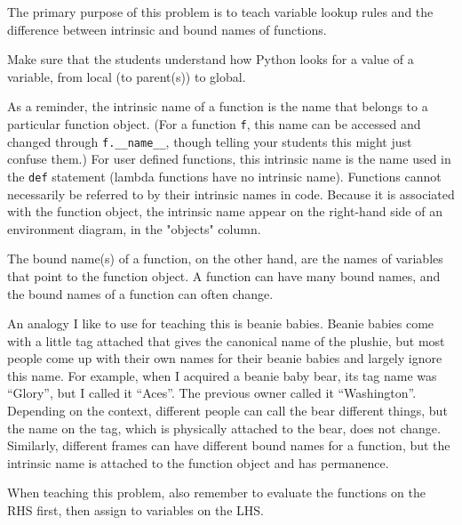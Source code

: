 \begin{questionmeta}
  The primary purpose of this problem is to teach variable lookup rules and the difference between intrinsic and bound names of functions. 

  Make sure that the students understand how Python looks for a value of a variable, from local (to parent(s)) to global.

  As a reminder, the intrinsic name of a function is the name that belongs to a particular function object. (For a function \lstinline{f}, this name can be accessed and changed through \lstinline{f.__name__}, though telling your students this might just confuse them.) For user defined functions, this intrinsic name is the name used in the \lstinline{def} statement (lambda functions have no intrinsic name). Functions cannot necessarily be referred to by their intrinsic names in code. Because it is associated with the function object, the intrinsic name appear on the right-hand side of an environment diagram, in the "objects" column. 
  
  The bound name(s) of a function, on the other hand, are the names of variables that point to the function object. A function can have many bound names, and the bound names of a function can often change. 
  
  An analogy I like to use for teaching this is beanie babies. Beanie babies come with a little tag attached that gives the canonical name of the plushie, but most people come up with their own names for their beanie babies and largely ignore this name. For example, when I acquired a beanie baby bear, its tag name was ``Glory'', but I called it ``Aces''. The previous owner called it ``Washington''. Depending on the context, different people can call the bear different things, but the name on the tag, which is physically attached to the bear, does not change. Similarly, different frames can have different bound names for a function, but the intrinsic name is attached to the function object and has permanence. 

  When teaching this problem, also remember to evaluate the functions on the RHS first, then assign to variables on the LHS.
\end{questionmeta}
    